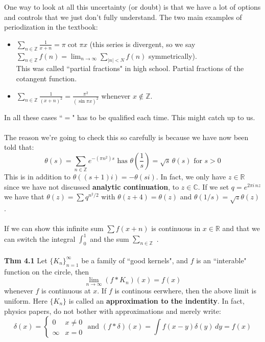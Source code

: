 \documentclass[12pt]{article}
\begin{document}
One way to look at all this uncertainty (or doubt) is that we have a lot of options and controls that we just don't fully understand.  The two main examples of periodization in the textbook:
\begin{itemize}
\item $\displaystyle \sum_{n \in \mathbb{Z}} \frac{1}{x+n} = \pi \cot \pi x $ (this series is divergent, so we say $\displaystyle \sum_{n \in \mathbb{Z}} f(n) = \lim_{n \to \infty} \sum_{|n| < N} f(n)$ symmetrically). \\ 
This was called ``partial fractions" in high school.  Partial fractions of the cotangent function.
\item $\displaystyle \sum_{n \in \mathbb{Z}} \frac{1}{(x+n)^2} = \frac{\pi^2}{(\sin \pi x)^2} $ whenever $x \notin \mathbb{Z}$.
\end{itemize}
In all these cases ``$=$" has to be qualified each time.  This might catch up to us.\\ \\
The reason we're going to check this so carefully is because we have now been told that:
$$ \theta(s) = \sum_{n \in \mathbb{Z}} e^{-(\pi n^2)s} \text{ has }\theta(\frac{1}{s}) = \sqrt{s} \, \theta(s) \text{ for }s > 0$$
This is in addition to $\theta((s+1)i) = -\theta(si)$.  In fact, we only have $z \in \mathbb{R}$ since we have not discussed \textbf{analytic continuation}, to $z \in \mathbb{C}$.  If we set $q = e^{2\pi i \, n z}$ we have that $\theta(z) = \sum q^{n^2/2}$ with $\theta(z+4) = \theta(z)$ and $\theta(1/s) = \sqrt{z} \theta(z)$. \\ \\
If we can show this infinite sum $\sum f(x+n)$ is continuous in $x \in \mathbb{R}$ and that we can switch the integral $\int_0^1$ and the sum $ \sum_{n \in \mathbb{Z}}$ . \\ \\
\textbf{Thm 4.1} Let $\{ K_n\}_{n=1}^\infty$ be a family of ``good kernels", and $f$ is an ``interable" function on the circle, then 
$$ \lim_{n \to \infty} (f \ast K_n)(x) = f(x) $$
whenever $f$ is continuous at $x$.  If $f$ is continous eerwhere, then the above limit is uniform.  Here $\{ K_n\}$ is called an \textbf{approximation to the indentity}.  In fact, physics papers, do not bother with approximations and merely write:
$$ \delta(x) = \left\{ \begin{array}{cc} 0 & x \neq 0\\ 
\infty & x = 0 \end{array} \right. 
\text{ and } (f*\delta)(x) = \int f(x-y)\delta(y) \, dy = f(x)$$
\end{document}
